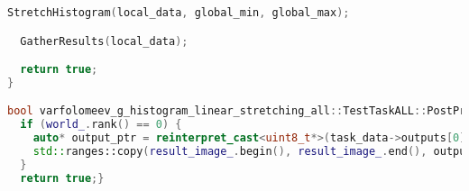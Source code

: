 \documentclass[a4paper,12pt]{article}
\begin{document}
\begin{lstlisting}[language=C++,
    breaklines=true,       % Автоматический перенос строк
    basicstyle=\small\ttfamily, % Уменьшенный шрифт
    columns=fullflexible ]
  StretchHistogram(local_data, global_min, global_max);

  GatherResults(local_data);

  return true;
}

bool varfolomeev_g_histogram_linear_stretching_all::TestTaskALL::PostProcessingImpl() {
  if (world_.rank() == 0) {
    auto* output_ptr = reinterpret_cast<uint8_t*>(task_data->outputs[0]);
    std::ranges::copy(result_image_.begin(), result_image_.end(), output_ptr);
  }
  return true;}
\end{lstlisting}
\end{document}
